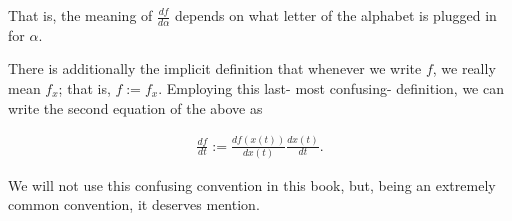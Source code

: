 That is, the meaning of $\frac{df}{d\alpha}$ depends on what letter of the alphabet is plugged in for $\alpha$.

There is additionally the implicit definition that whenever we write $f$, we really mean $f_x$; that is, $f := f_x$. Employing this last- most confusing- definition, we can write the second equation of the above as

\begin{align*}
    \frac{df}{dt} := \frac{df(x(t))}{dx(t)} \frac{dx(t)}{dt}.
\end{align*}

We will not use this confusing convention in this book, but, being an extremely common convention, it deserves mention. 

\begin{comment}

Let's now consider the situation from a more general perspective. Just as occurred in the above example, every symbol $S$ representing a physical quantity is typically associated with a ``preferred symbol'' $T$, in the sense that we prefer to think of the physical quantity represented by $S$ as depending on the physical quantity represented by $T$ rather than as depending on some other physical quantity. In the above example, the preferred symbol of $F$ would be $x$, since we started with the functions $F_x$ and $x_t$. $F$'s preferred symbol is \textit{not} $t$, because we did not start with the function $F_t$, and instead had to deduce it from $F_x$ and $x_t$.

In general, let's use $\overline{S}$ to denote the preferred symbol of an arbitrary symbol $S$, and let's use $S_T$ to denote the function that maps the physical quantity represented by $T$ to the physical quantity denoted by $S$. Note that in analogy to the fact $F_t = F_x \circ x_t$, we have $S_T = S_{\overline{S}} \circ \overline{S}_T$. [We'll also establish the convention that for any symbol $S_S$ is equal to the identity function for any symbol $S$.] 

One last notion we'll need is that of a symbol being an ``eventual preferred letter''. We will say that a symbol $T$ is an \textit{eventual preferred letter} of a symbol $S$ if $T$ is one of the symbols $\overline{S}, \overline{\overline{S}}, \overline{\overline{\overline{S}}}, \overline{\overline{\overline{\overline{S}}}}, ...,$ and so on.

Now, remember how we conflated $F$ with $F_x$ previously? Analogously, when it is clear what a symbol $S$'s preferred symbol $\overline{S}$ is, it makes some sense to conflate the symbol $S$ with the function $S_{\overline{S}}$. Once this conflation has been established, then it is sensible to define 


\end{comment}
